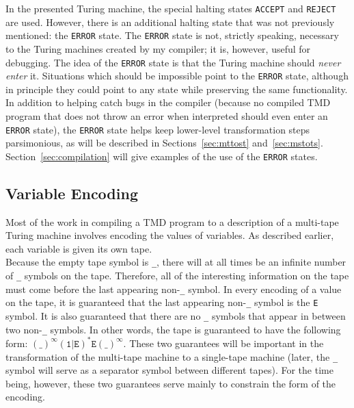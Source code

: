 \documentclass[11pt]{report}
\begin{document}
In the presented Turing machine, the special halting states \texttt{ACCEPT} and \texttt{REJECT} are used. However, there is an additional halting state that was not previously mentioned: the \texttt{ERROR} state. The \texttt{ERROR} state is not, strictly speaking, necessary to the Turing machines created by my compiler; it is, however, useful for debugging. The idea of the \texttt{ERROR} state is that the Turing machine should \emph{never enter} it. Situations which should be impossible point to the \texttt{ERROR} state, although in principle they could point to any state while preserving the same functionality. In addition to helping catch bugs in the compiler (because no compiled TMD program that does not throw an error when interpreted should even enter an \texttt{ERROR} state), the \texttt{ERROR} state helps keep lower-level transformation steps parsimonious, as will be described in Sections~\ref{sec:mttost} and~\ref{sec:mstots}. Section~\ref{sec:compilation} will give examples of the use of the \texttt{ERROR} states. \\

\subsection{Variable Encoding}

\indent Most of the work in compiling a TMD program to a description of a multi-tape Turing machine involves encoding the values of variables. As described earlier, each variable is given its own tape. \\

Because the empty tape symbol is \texttt{\_}, there will at all times be an infinite number of \texttt{\_} symbols on the tape. Therefore, all of the interesting information on the tape must come before the last appearing non-\texttt{\_} symbol. In every encoding of a value on the tape, it is guaranteed that the last appearing non-\texttt{\_} symbol is the \texttt{E} symbol. It is also guaranteed that there are no \texttt{\_} symbols that appear in between two non-\texttt{\_} symbols. In other words, the tape is guaranteed to have the following form: $(\texttt{\_})^\infty(\texttt{1}|\texttt{E})^*\texttt{E}(\texttt{\_})^\infty$. These two guarantees will be important in the transformation of the multi-tape machine to a single-tape machine (later, the \texttt{\_} symbol will serve as a separator symbol between different tapes). For the time being, however, these two guarantees serve mainly to constrain the form of the encoding. \\
\end{document}
